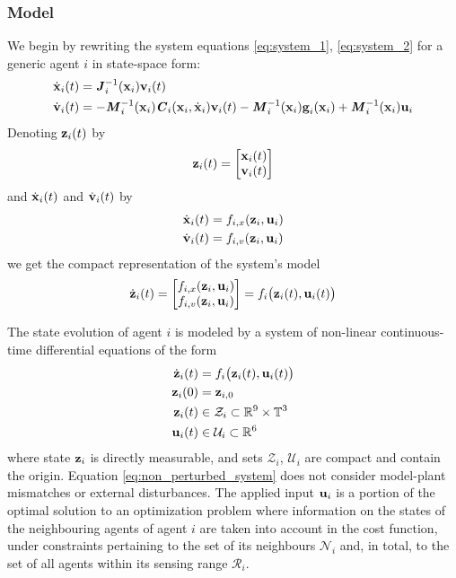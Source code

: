 \subsubsection{Model}

We begin by rewriting the system equations \eqref{eq:system_1},
\eqref{eq:system_2} for a generic agent $i$ in state-space form:
\begin{align}
  \dot{\bm{\mathbf{x}}}_i(t) &= \bm{\mathit{J}}_i^{-1}(\bm{\mathbf{x}}_i) \bm{\mathbf{v}}_i(t) \\
  \dot{\bm{\mathbf{v}}}_i(t) &= -\bm{\mathit{M}}_i^{-1}(\bm{\mathbf{x}}_i)\bm{\mathit{C}}_i(\bm{\mathbf{x}}_i,\dot{\bm{\mathbf{x}}}_i) \bm{\mathbf{v}}_i(t)
    - \bm{\mathit{M}}_i^{-1}(\bm{\mathbf{x}}_i)\bm{\mathbf{g}}_i(\bm{\mathbf{x}}_i)
    + \bm{\mathit{M}}_i^{-1}(\bm{\mathbf{x}}_i)\bm{\mathbf{u}}_i
\label{eq:system}
\end{align}
Denoting $\bm{\mathbf{z}}_i(t)$ by
\begin{align}
  \bm{\mathbf{z}}_i(t) =
    \begin{bmatrix}
      \bm{\mathbf{x}}_i(t) \\
      \bm{\mathbf{v}}_i(t) \\
    \end{bmatrix}
\end{align}
and
$\dot{\bm{\mathbf{x}}}_i(t)$ and $\dot{\bm{\mathbf{v}}}_i(t)$ by
\begin{align}
  \dot{\bm{\mathbf{x}}}_i(t) &= f_{i,x}(\bm{\mathbf{z}}_i, \bm{\mathbf{u}}_i) \\
  \dot{\bm{\mathbf{v}}}_i(t) &= f_{i,v}(\bm{\mathbf{z}}_i, \bm{\mathbf{u}}_i)
\end{align}
we get the compact representation of the system's model
\begin{align}
  \dot{\bm{\mathbf{z}}}_i(t) =
    \begin{bmatrix}
      f_{i,x}(\bm{\mathbf{z}}_i, \bm{\mathbf{u}}_i) \\
      f_{i,v}(\bm{\mathbf{z}}_i, \bm{\mathbf{u}}_i) \\
    \end{bmatrix} =
 f_i \big(\bm{\mathbf{z}}_i (t), \bm{\mathbf{u}}_i (t)\big)
\end{align}

The state evolution of agent $i$ is modeled by a system of non-linear
continuous-time differential equations of the form
\begin{align}
  \dot{\bm{\mathbf{z}}}_i(t) &= f_i \big(\bm{\mathbf{z}}_i (t), \bm{\mathbf{u}}_i (t)\big) \label{eq:non_perturbed_system}\\
  \bm{\mathbf{z}}_i(0) &= \bm{\mathbf{z}}_{i,0} \\
  \bm{\mathbf{z}}_i (t) &\in \mathcal{Z}_i \subset \mathbb{R}^{9} \times \mathbb{T}^3 \\
  \bm{\mathbf{u}}_i (t) &\in \mathcal{U}_i \subset \mathbb{R}^6
\end{align}
where state $\bm{\mathbf{z}}_i$ is directly measurable, and sets $\mathcal{Z}_i$,
$\mathcal{U}_i$ are compact and contain the origin. Equation
\ref{eq:non_perturbed_system} does not consider model-plant mismatches or
external disturbances. The applied input $\bm{\mathbf{u}}_i$ is a portion of the
optimal solution to an optimization problem where information on the states
of the neighbouring agents of agent $i$ are taken into account in the cost
function, under constraints pertaining to the set of its neighbours
$\mathcal{N}_i$ and, in total, to the set of all agents within its sensing range
$\mathcal{R}_i$.

